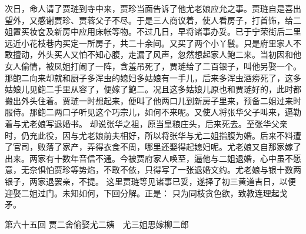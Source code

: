 \documentclass[12pt,oneside]{book}
\begin{document}
次日，命人请了贾琏到寺中来，贾珍当面告诉了他尤老娘应允之事。贾琏自是喜出望外，又感谢贾珍、贾蓉父子不尽。于是三人商议着，使人看房子，打首饰，给二姐置买妆奁及新房中应用床帐等物。不过几日，早将诸事办妥。已于宁荣街后二里远近小花枝巷内买定一所房子，共二十余间。又买了两个小丫鬟。只是府里家人不敢擅动，外头买人又怕不知心腹，走漏了风声，忽然想起家人鲍二来。当初因和他女人偷情，被凤姐打闹了一阵，含羞吊死了，贾琏给了二百银子，叫他另娶一个。那鲍二向来却就和厨子多浑虫的媳妇多姑娘有一手儿，后来多浑虫酒痨死了，这多姑娘儿见鲍二手里从容了，便嫁了鲍二。况且这多姑娘儿原也和贾琏好的，此时都搬出外头住着。贾琏一时想起来，便叫了他两口儿到新房子里来，预备二姐过来时服侍。那鲍二两口子听见这个巧宗儿，如何不来呢。又使人将张华父子叫来，逼勒着与尤老娘写退婚书。
却说张华之祖，原当皇粮庄头，后来死去。至张华父亲时，仍充此役，因与尤老娘前夫相好，所以将张华与尤二姐指腹为婚。后来不料遭了官司，败落了家产，弄得衣食不周，哪里还娶得起媳妇呢。尤老娘又自那家嫁了出来。两家有十数年音信不通。今被贾府家人唤至，逼他与二姐退婚，心中虽不愿意，无奈惧怕贾珍等势焰，不敢不依，只得写了一张退婚文约。尤老娘与银十数两银子，两家退罢亲，不提。
这里贾琏等见诸事已妥，遂择了初三黄道吉日，以便迎娶二姐过门。未知如何，下回分解。正是：
只为同枝贪色欲，致教连理起戈矛。


 
第六十五回  贾二舍偷娶尤二姨　尤三姐思嫁柳二郎
\end{document}
